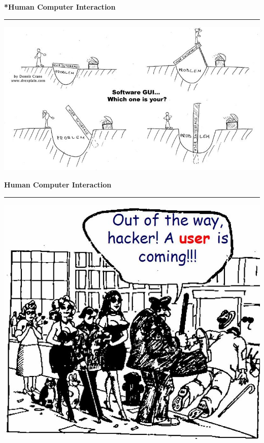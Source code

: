 \documentclass[pdf]{beamer}
\begin{document}
{{
\begin{frame}
\vspace{8mm}
\textcolor{myBlue}{\textbf{\Large{*Human Computer Interaction}}}

\textcolor{red}{\rule{10cm}{1mm}}

\centering
\includegraphics[scale=0.35]{0_motto.JPG}

\end{frame}}




{
\begin{frame}
\vspace{8mm}
\textcolor{myBlue}{\textbf{\Large{Human Computer Interaction}}}

\textcolor{red}{\rule{10cm}{1mm}}

\centering
\includegraphics[scale=0.35]{3_out_of_the_way_hacker.JPG}


\end{frame}}}
\end{document}
